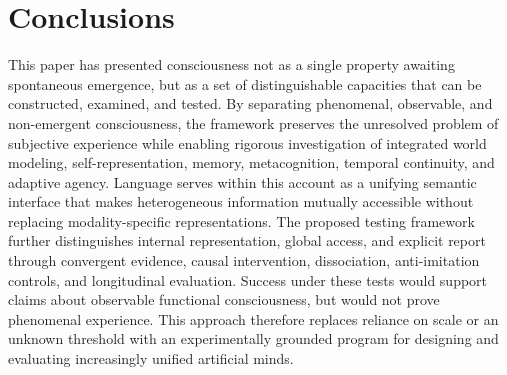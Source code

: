 \section{\textbf{Conclusions}}
This paper has presented consciousness not as a single property awaiting spontaneous emergence, but as a set of distinguishable capacities that can be constructed, examined, and tested. By separating phenomenal, observable, and non-emergent consciousness, the framework preserves the unresolved problem of subjective experience while enabling rigorous investigation of integrated world modeling, self-representation, memory, metacognition, temporal continuity, and adaptive agency. Language serves within this account as a unifying semantic interface that makes heterogeneous information mutually accessible without replacing modality-specific representations.
The proposed testing framework further distinguishes internal representation, global access, and explicit report through convergent evidence, causal intervention, dissociation, anti-imitation controls, and longitudinal evaluation. Success under these tests would support claims about observable functional consciousness, but would not prove phenomenal experience. This approach therefore replaces reliance on scale or an unknown threshold with an experimentally grounded program for designing and evaluating increasingly unified artificial minds.